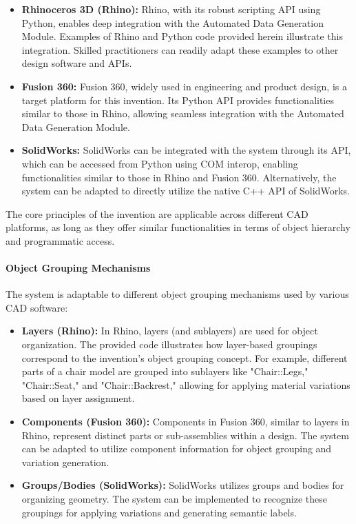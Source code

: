 \documentclass[12pt]{article}
\begin{document}
\begin{itemize}
    \item \textbf{Rhinoceros 3D (Rhino):} Rhino, with its robust scripting API using Python, enables deep integration with the Automated Data Generation Module. Examples of Rhino and Python code provided herein illustrate this integration. Skilled practitioners can readily adapt these examples to other design software and APIs.
    \item \textbf{Fusion 360:} Fusion 360, widely used in engineering and product design, is a target platform for this invention. Its Python API provides functionalities similar to those in Rhino, allowing seamless integration with the Automated Data Generation Module.
    \item \textbf{SolidWorks:} SolidWorks can be integrated with the system through its API, which can be accessed from Python using COM interop, enabling functionalities similar to those in Rhino and Fusion 360. Alternatively, the system can be adapted to directly utilize the native C++ API of SolidWorks.
\end{itemize}

The core principles of the invention are applicable across different CAD platforms, as long as they offer similar functionalities in terms of object hierarchy and programmatic access.

\paragraph{Object Grouping Mechanisms}

The system is adaptable to different object grouping mechanisms used by various CAD software:

\begin{itemize}
    \item \textbf{Layers (Rhino):} In Rhino, layers (and sublayers) are used for object organization. The provided code illustrates how layer-based groupings correspond to the invention's object grouping concept. For example, different parts of a chair model are grouped into sublayers like  "Chair::Legs," "Chair::Seat," and "Chair::Backrest," allowing for applying material variations based on layer assignment.

    \item \textbf{Components (Fusion 360):} Components in Fusion 360, similar to layers in Rhino, represent distinct parts or sub-assemblies within a design. The system can be adapted to utilize component information for object grouping and variation generation.

    \item \textbf{Groups/Bodies (SolidWorks):} SolidWorks utilizes groups and bodies for organizing geometry. The system can be implemented to recognize these groupings for applying variations and generating semantic labels.
\end{itemize}
\end{document}

